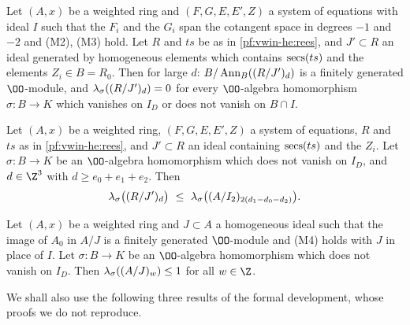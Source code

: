 \begin{lemma}\label{pf:vwin-he:ann}
Let $(A,x)$ be a weighted ring and $(F,G,E,E',Z)$ a system of equations with ideal $I$ such that the $F_i$ and the
$G_i$ span the cotangent space in degrees $-1$ and $-2$ and \textup{(M2)}, \textup{(M3)} hold. Let $R$ and $ts$ be as
in \cref{pf:vwin-he:rees}, and $J'\subset R$ an ideal generated by homogeneous elements which contains
$\operatorname{secs}(ts)$ and the elements $Z_i\in B=R_0$. Then for large $d$: $B/\operatorname{Ann}_B((R/J')_d)$ is a finitely
generated $\OO$-module, and $\lambda_\sigma((R/J')_d)=0$ for every $\OO$-algebra homomorphism $\sigma:B\to K$
which vanishes on $I_D$ or does not vanish on $B\cap I$.
\end{lemma}

\begin{lemma}\label{pf:vwin-he:loc1}
Let $(A,x)$ be a weighted ring, $(F,G,E,E',Z)$ a system of equations, $R$ and $ts$ as in \cref{pf:vwin-he:rees}, and
$J'\subset R$ an ideal containing $\operatorname{secs}(ts)$ and the $Z_i$. Let $\sigma:B\to K$ be an $\OO$-algebra
homomorphism which does not vanish on $I_D$, and $d\in\Z^3$ with $d\ge e_0+e_1+e_2$. Then
\[
 \vwinheloclen_\sigma\bigl((R/J')_d\bigr)\ \le\ \vwinheloclen_\sigma\bigl((A/I_2)_{2(d_1-d_0-d_2)}\bigr).
\]
\end{lemma}

\begin{lemma}\label{pf:vwin-he:loc3}
Let $(A,x)$ be a weighted ring and $J\subset A$ a homogeneous ideal such that the image of $A_0$ in $A/J$ is a
finitely generated $\OO$-module and \textup{(M4)} holds with $J$ in place of $I$. Let $\sigma:B\to K$ be an
$\OO$-algebra homomorphism which does not vanish on $I_D$. Then $\lambda_\sigma((A/J)_w)\le1$ for all $w\in\Z$.
\end{lemma}

We shall also use the following three results of the formal development, whose proofs we do not reproduce.

